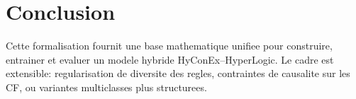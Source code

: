 \documentclass[11pt,a4paper]{article}
\begin{document}
\section{Conclusion}
Cette formalisation fournit une base mathematique unifiee pour
construire, entrainer et evaluer un modele hybride HyConEx--HyperLogic.
Le cadre est extensible:
regularisation de diversite des regles, contraintes de causalite sur les CF,
ou variantes multiclasses plus structurees.
\end{document}
